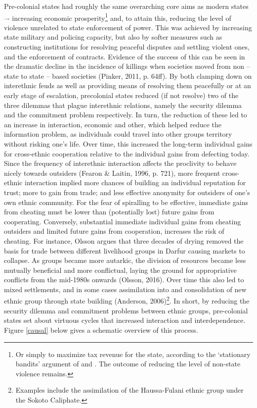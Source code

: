 \documentclass[12pt]{article}
\begin{document}
Pre-colonial states had roughly the same overarching core aims as modern states
–- increasing economic prosperity\footnote{Or simply to maximize tax revenue for
	the state, according to the `stationary bandits' argument of
	\citet{tilly_1985} and \citet{Olson1993}. The outcome of reducing the
level of non-state violence remains.} and, to attain this, reducing the level of
violence unrelated to state enforcement of power. This was achieved by
increasing state military and policing capacity, but also by softer measures
such as constructing institutions for resolving peaceful disputes and settling
violent ones, and the enforcement of contracts.  Evidence of the success of this
can be seen in the dramatic decline in the incidence of killings when societies
moved from non -- state to state -- based societies (Pinker, 2011, p. 64ff). By
both clamping down on interethnic feuds as well as providing means of resolving
them peacefully or at an early stage of escalation, precolonial states reduced
(if not resolve) two of the three dilemmas that plague interethnic relations,
namely the security dilemma and the commitment problem respectively. In turn,
the reduction of these led to an increase in interaction, economic and other,
which helped reduce the information problem, as individuals could travel into
other groups territory without risking one’s life. Over time, this increased the
long-term individual gains for cross-ethnic cooperation relative to the
individual gains from defecting today. Since the frequency of interethnic
interaction affects the proclivity to behave nicely towards outsiders (Fearon \&
Laitin, 1996, p. 721), more frequent cross-ethnic interaction implied more
chances of building an individual reputation for trust; more to gain from trade;
and less effective anonymity for outsiders of one’s own ethnic community. For
the fear of spiralling to be effective, immediate gains from cheating must be
lower than (potentially lost) future gains from cooperating. Conversely,
substantial immediate individual gains from cheating outsiders and limited
future gains from cooperation, increases the risk of cheating. For instance,
Olsson argues that three decades of drying removed the basis for trade between
different livelihood groups in Darfur causing markets to collapse. As groups
became more autarkic, the division of resources became less mutually beneficial
and more conflictual, laying the ground for appropriative conflicts from the
mid-1980s onwards (Olsson, 2016). Over time this also led to mixed settlements,
and in some cases assimilation into and consolidation of new ethnic group
through state building (Anderson, 2006)\footnote{Examples include the
assimilation of the Haussa-Fulani ethnic group under the Sokoto Caliphate.}. In
short, by reducing the security dilemma and commitment problems between ethnic
groups, pre-colonial states set about virtuous cycles that increased interaction
and interdependence. Figure \ref{causal} below gives a schematic overview of
this process.
\end{document}
